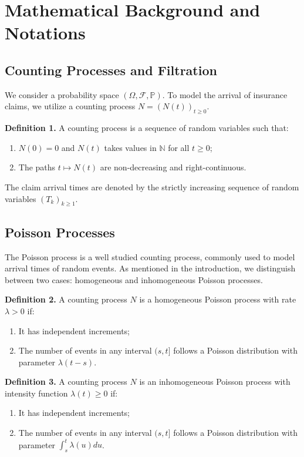 \documentclass[a4paper,11pt]{article}
\begin{document}
\clearpage
\section{Mathematical Background and Notations}

\subsection{Counting Processes and Filtration}
We consider a probability space $(\Omega, \mathcal{F}, \mathbb{P})$. To model the arrival of insurance claims, we utilize a counting process $N = (N(t))_{t \geq 0}$.

\textbf{Definition 1.} A counting process is a sequence of random variables such that:
\begin{enumerate}
    \item[(i)] $N(0) = 0$ and $N(t)$ takes values in $\mathbb{N}$ for all $t \geq 0$;
    \item[(ii)] The paths $t \mapsto N(t)$ are non-decreasing and right-continuous.
\end{enumerate}

The claim arrival times are denoted by the strictly increasing sequence of random variables $ (T_k)_{k \geq 1}$.

\subsection{Poisson Processes}
The Poisson process is a well studied counting process, commonly used to model arrival times of random events. As mentioned in the introduction, we distinguish between two cases: homogeneous and inhomogeneous Poisson processes.

\textbf{Definition 2.} A counting process $N$ is a homogeneous Poisson process with rate $\lambda > 0$ if:
\begin{enumerate}
    \item[(i)] It has independent increments;
    \item[(ii)] The number of events in any interval $(s, t]$ follows a Poisson distribution with parameter $\lambda(t-s)$.
\end{enumerate}

\textbf{Definition 3.} A counting process $N$ is an inhomogeneous Poisson process with intensity function $\lambda(t) \ge 0$ if:
\begin{enumerate}
    \item[(i)] It has independent increments;
    \item[(ii)] The number of events in any interval $(s, t]$ follows a Poisson distribution with parameter $\int_s^t \lambda(u) du$.
\end{enumerate}
\end{document}
